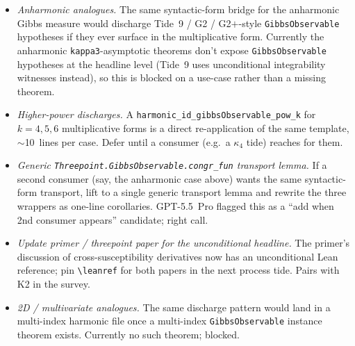\documentclass[11pt]{article}
\begin{document}
\begin{itemize}
\item \emph{Anharmonic analogues.} The same syntactic-form bridge for
  the anharmonic Gibbs measure would discharge Tide~9 / G2 /
  G2$+$-style \texttt{GibbsObservable} hypotheses if they ever
  surface in the multiplicative form. Currently the anharmonic
  \texttt{kappa3}-asymptotic theorems don't expose
  \texttt{GibbsObservable} hypotheses at the headline level (Tide~9
  uses unconditional integrability witnesses instead), so this is
  blocked on a use-case rather than a missing theorem.

\item \emph{Higher-power discharges.} A \texttt{harmonic\_id\_gibbsObservable\_pow\_k}
  for $k = 4, 5, 6$ multiplicative forms is a direct re-application
  of the same template, $\sim$10~lines per case. Defer until a
  consumer (e.g.\ a $\kappa_4$ tide) reaches for them.

\item \emph{Generic \texttt{Threepoint.GibbsObservable.congr\_fun}
  transport lemma.} If a second consumer (say, the anharmonic case
  above) wants the same syntactic-form transport, lift to a single
  generic transport lemma and rewrite the three wrappers as
  one-line corollaries. GPT-5.5~Pro flagged this as a
  ``add when 2nd consumer appears'' candidate; right call.

\item \emph{Update primer / threepoint paper for the unconditional
  headline.} The primer's discussion of cross-susceptibility
  derivatives now has an unconditional Lean reference; pin
  \texttt{\textbackslash leanref} for both papers in the next
  process tide. Pairs with K2 in the survey.

\item \emph{2D / multivariate analogues.} The same discharge pattern
  would land in a multi-index harmonic file once a multi-index
  \texttt{GibbsObservable} instance theorem exists. Currently no
  such theorem; blocked.
\end{itemize}
\end{document}
